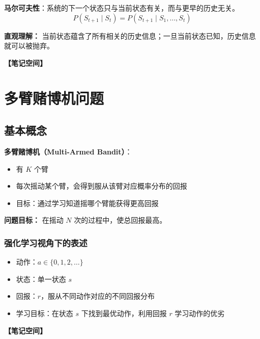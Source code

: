 \documentclass[12pt,a4paper]{article}
\newcommand{\notespace}[1][3cm]{%
  \vspace{#1}%
  \noindent\textbf{【笔记空间】}%
  \vspace{#1}%
}
\newcommand{\1}{\mathbf{1}}
\begin{document}
\begin{keybox}
\textbf{马尔可夫性}：系统的下一个状态只与当前状态有关，而与更早的历史无关。
\begin{equation}
P(S_{t+1}\mid S_t)=P(S_{t+1}\mid S_1,\dots,S_t)
\end{equation}
\end{keybox}

\textbf{直观理解：} 当前状态蕴含了所有相关的历史信息；一旦当前状态已知，历史信息就可以被抛弃。

\notespace[3cm]

\newpage

\section{多臂赌博机问题}

\subsection{基本概念}

\textbf{多臂赌博机（Multi-Armed Bandit）}：

\begin{itemize}[leftmargin=2em]
  \item 有 $K$ 个臂
  \item 每次摇动某个臂，会得到服从该臂对应概率分布的回报
  \item 目标：通过学习知道摇哪个臂能获得更高回报
\end{itemize}

\textbf{问题目标：} 在摇动 $N$ 次的过程中，使总回报最高。

\subsubsection*{强化学习视角下的表述}

\begin{itemize}[leftmargin=2em]
  \item 动作：$a \in \{0,1,2,\dots\}$
  \item 状态：单一状态 $s$
  \item 回报：$r$，服从不同动作对应的不同回报分布
  \item 学习目标：在状态 $s$ 下找到最优动作，利用回报 $r$ 学习动作的优劣
\end{itemize}

\notespace[2cm]
\end{document}
